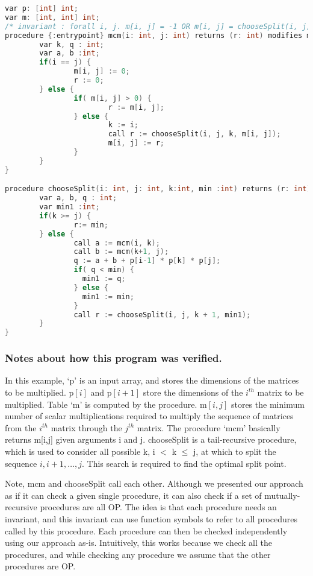 \begin{lstlisting}[language=c, caption= {Returns the minimum number of multipications needed to multiply a sequence of matrices.}, label=lst:mcm]
var p: [int] int;
var m: [int, int] int;
/* invariant : forall i, j. m[i, j] = -1 OR m[i, j] = chooseSplit(i, j, i, -1) */
procedure {:entrypoint} mcm(i: int, j: int) returns (r: int) modifies m;{
        var k, q : int;
        var a, b :int;
        if(i == j) {
                m[i, j] := 0;
                r := 0;
        } else {
                if( m[i, j] > 0) {
                        r := m[i, j];
                } else {
                        k := i;
                        call r := chooseSplit(i, j, k, m[i, j]);
                        m[i, j] := r;
                }
        }
}

procedure chooseSplit(i: int, j: int, k:int, min :int) returns (r: int) modifies m;{
        var a, b, q : int;
        var min1 :int;
        if(k >= j) {
                r:= min;
        } else {        
                call a := mcm(i, k);
                call b := mcm(k+1, j);
                q := a + b + p[i-1] * p[k] * p[j];
                if( q < min) {
                  min1 := q;
                } else {
                  min1 := min;
                }
                call r := chooseSplit(i, j, k + 1, min1);
        }       
}
\end{lstlisting}

\subsubsection{Notes about how this program was verified.}
In this example, `p' is an input array, and stores the dimensions of the matrices
to be multiplied. p$[i]$ and p$[i+1]$ store the dimensions of the $i^\mathit{th}$
matrix to be multiplied. Table `m' is computed by the procedure. m$[i,j]$
stores the minimum number of scalar multiplications required
to multiply the sequence of matrices from the $i^\mathit{th}$ matrix
through the $j^\mathit{th}$ matrix. The procedure `mcm'
basically returns m[i,j] given arguments i and j. chooseSplit is a
tail-recursive procedure, which is used to consider all possible k, i $<$ k
$\leq$ j, at which to split the sequence $i, i+1, \ldots, j$. This search
is required to find the optimal split point.

Note, mcm and chooseSplit call each other. Although we presented our
approach as if it can check a given single procedure, it can also check if
a set of mutually-recursive procedures are all OP. The idea is that each
procedure needs an invariant, and this invariant can use function symbols
to refer to all procedures called by this procedure. Each procedure can
then be checked independently using our approach as-is. Intuitively, this
works because we check all the procedures, and while checking any procedure
we assume that the other procedures are OP.

